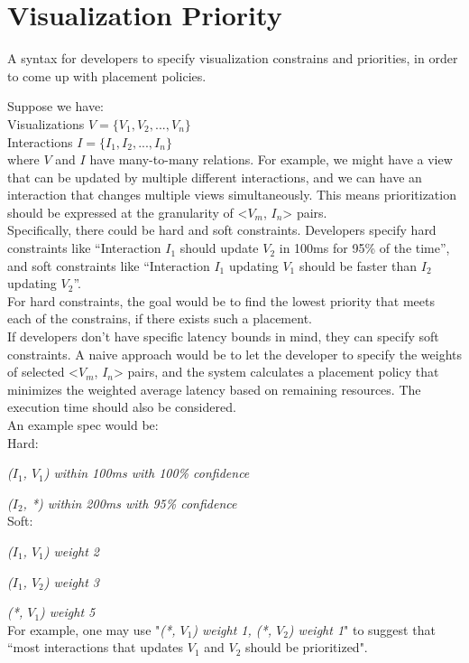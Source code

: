 


\section*{Visualization Priority}

\begin{problem}
  A syntax for developers to specify visualization constrains and priorities, in order to come up with placement policies.
\end{problem}

Suppose we have:\\

\hspace{10mm} Visualizations $V = \{V_1, V_2, ..., V_n\}$\\

\hspace{10mm} Interactions $I = \{I_1, I_2, ..., I_n\}$\\

where $V$ and $I$ have many-to-many relations. For example, we might have a view that can be updated by multiple different interactions, and we can have an interaction that changes multiple views simultaneously. This means prioritization should be expressed at the granularity of <$V_m$, $I_n$> pairs.\\

Specifically, there could be hard and soft constraints. Developers specify hard constraints like ``Interaction $I_1$ should update $V_2$ in 100ms for 95\% of the time”, and soft constraints like “Interaction $I_1$ updating $V_1$ should be faster than $I_2$ updating $V_2$”. \\

For hard constraints, the goal would be to find the lowest priority that meets each of the constrains, if there exists such a placement. \\

If developers don't have specific latency bounds in mind, they can specify soft constraints. A naive approach would be to let the developer to specify the weights of selected <$V_m$, $I_n$> pairs, and the system calculates a placement policy that minimizes the weighted average latency based on remaining resources. The execution time should also be considered. \\

An example spec would be:\\

Hard:

\textit{($I_1$, $V_1$) within 100ms with 100\% confidence}

\textit{($I_2$, *) within 200ms with 95\% confidence}\\

Soft:

\textit{($I_1$, $V_1$) weight 2}

\textit{($I_1$, $V_2$) weight 3}

\textit{(*, $V_1$) weight 5}\\

 For example, one may use "\textit{(*, $V_1$) weight 1, (*, $V_2$) weight 1}" to suggest that ``most interactions that updates $V_1$ and $V_2$ should be prioritized".


